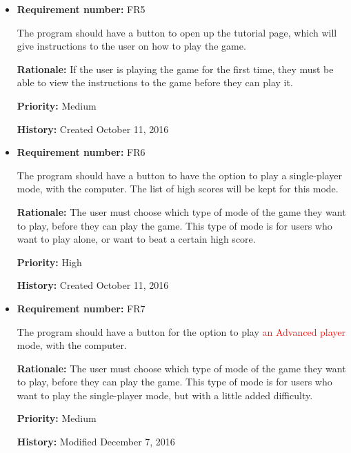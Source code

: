 \documentclass[12pt,letterpaper]{article}
\begin{document}
\begin{reqbox}
	\begin{itemize}
		\item \textbf{Requirement number: }FR5

		The program should have a button to open up the tutorial page, which will give instructions to the user on how to play the game.

		\textbf{Rationale: }If the user is playing the game for the first time, they must be able to view the instructions to the game before they can play it.

		\textbf{Priority: }Medium

		\textbf{History: }Created October 11, 2016
	\end{itemize}
\end{reqbox}

\begin{reqbox}
	\begin{itemize}

		\item \textbf{Requirement number: }FR6

		The program should have a button to have the option to play a single-player mode, with the computer. The list of high scores will be kept for this mode.

		\textbf{Rationale: }The user must choose which type of mode of the game they want to play, before they can play the game. This type of mode is for users who want to play alone, or want to beat a certain high score.

		\textbf{Priority: }High

		\textbf{History: }Created October 11, 2016

	\end{itemize}
\end{reqbox}

\begin{reqbox}
	\begin{itemize}
		\item \textbf{Requirement number: }FR7

		The program should have a button for the option to play \textcolor{red}{an Advanced player} mode, with the computer. 

		\textbf{Rationale: }The user must choose which type of mode of the game they want to play, before they can play the game. This type of mode is for users who want to play the single-player mode, but with a little added difficulty.

		\textbf{Priority: }Medium

		\textbf{History: }Modified December 7, 2016
	\end{itemize}
\end{reqbox}
\end{document}
